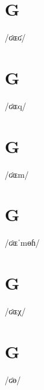 \documentclass[10pt,a4paper,twoside]{book}
\begin{document}
\section*{G}

\begin{multicols}{3}
 {/ʛɶʛ/} {}
\end{multicols}

\section*{G}

\begin{multicols}{3}
 {/ʛɶq/} {}
\end{multicols}

\section*{G}

\begin{multicols}{3}
 {/ʛɶm/} {}
\end{multicols}

\section*{G}

\begin{multicols}{3}
 {/ʛɶˈmɵɦ/} {}
\end{multicols}

\section*{G}

\begin{multicols}{3}
 {/ʛɶχ/} {}
\end{multicols}

\section*{G}

\begin{multicols}{3}
 {/ʛɵ/} {}
\end{multicols}
\end{document}
